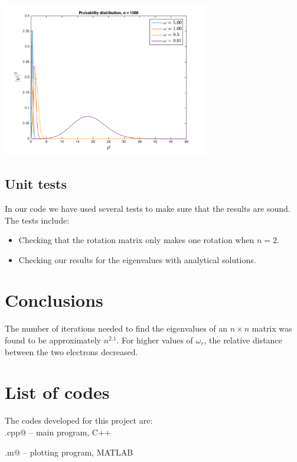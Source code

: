 \documentclass{article}
\begin{document}
\begin{multicols}{2}
\begin{center}
	\includegraphics[width=90mm]{../build-Project2-Desktop_Qt_5_5_0_clang_64bit-Debug/probability_distribution.png} 	
	\label{fig:prob_dist}
\end{center}


\subsection{Unit tests}
In our code we have used several tests to make sure that the results are sound. The tests include:

\begin{itemize}
	\item Checking that the rotation matrix only makes one rotation when $n = 2$.
	\item Checking our results for the eigenvalues with analytical solutions.
\end{itemize}


%
%




\section{Conclusions}
The number of iterations needed to find the eigenvalues of an $n\times n$ matrix was found to be approximately $n^2.1$.
For higher values of $\omega_r$, the relative distance between the two electrons decreased.





\section{List of codes}

The codes developed for this project are:\\

\noindent \verb@main.cpp@ -- main program, C++

\noindent \verb@plotting.m@ -- plotting program, MATLAB

\end{multicols}
\end{document}

